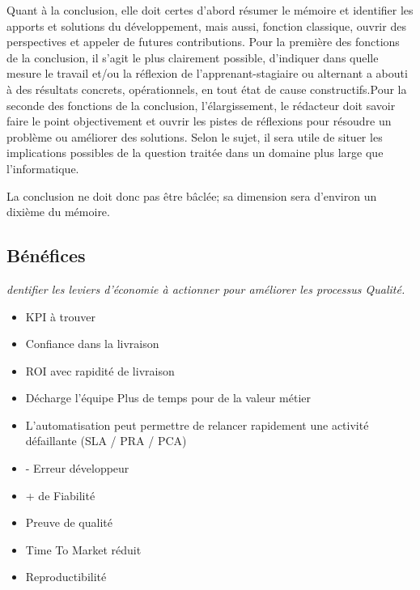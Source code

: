 
Quant à la conclusion, elle doit certes d’abord résumer le mémoire et identifier les apports et  solutions du  développement,  mais  aussi,  fonction  classique, ouvrir  des  perspectives et appeler de futures contributions. Pour la première des fonctions de la conclusion, il s’agit le plus clairement possible, d’indiquer dans quelle mesure le travail et/ou la réflexion de l’apprenant-stagiaire ou alternant a abouti à des résultats concrets, opérationnels, en tout état de cause constructifs.Pour la seconde des fonctions de la conclusion, l’élargissement, le rédacteur doit savoir faire le  point  objectivement  et  ouvrir  les  pistes  de réflexions pour  résoudre  un  problème  ou améliorer des solutions. Selon le sujet, il sera utile de situer les implications possibles de la question traitée dans un domaine plus large que l’informatique.

La  conclusion  ne  doit  donc  pas  être  bâclée;  sa  dimension sera d’environ un dixième du mémoire.

\subsection{Bénéfices}


\textit{dentifier les leviers d’économie à actionner pour améliorer les processus Qualité.}

\begin{itemize}
	\item KPI à trouver
	\item Confiance dans la livraison
	\item ROI avec rapidité de livraison
	\item Décharge l'équipe
	\subitem Plus de temps pour de la valeur métier
	\item L'automatisation peut permettre de relancer rapidement une activité défaillante (SLA / PRA / PCA)
\end{itemize}

\begin{itemize}
	\item - Erreur développeur
	\item + de Fiabilité
	\item Preuve de qualité
	\item Time To Market réduit
	\item Reproductibilité
\end{itemize}

